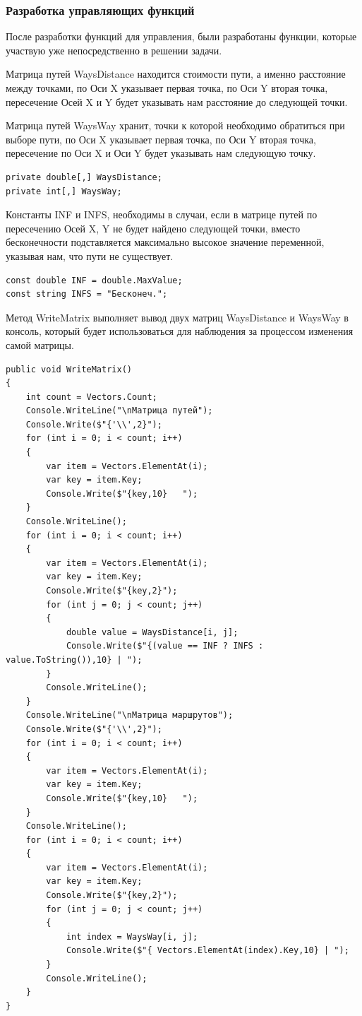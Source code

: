 \documentclass[a4paper,14pt, Times New Roman]{extarticle}
\begin{document}
\subsubsection{Разработка управляющих функций}
После разработки функций для управления, были разработаны функции, которые участвую уже непосредственно в решении задачи. 

Матрица путей WaysDistance находится стоимости пути, а именно расстояние между точками, по Оси X указывает первая точка, по Оси Y вторая точка, пересечение Осей X и Y будет указывать нам расстояние до следующей точки.

Матрица путей WaysWay хранит, точки к которой необходимо обратиться при выборе пути, по Оси X указывает первая точка, по Оси Y вторая точка, пересечение по Оси X и Оси Y будет указывать нам следующую точку.

\begin{lstlisting}
private double[,] WaysDistance;
private int[,] WaysWay;
\end{lstlisting}

Константы INF и INFS, необходимы в случаи, если в матрице путей по пересечению Осей X, Y не будет найдено следующей точки, вместо бесконечности подставляется максимально высокое значение переменной, указывая нам, что пути не существует.

\begin{lstlisting}
const double INF = double.MaxValue;
const string INFS = "Бесконеч.";
\end{lstlisting}

Метод WriteMatrix выполняет вывод двух матриц WaysDistance и WaysWay в консоль, который будет использоваться для наблюдения за процессом изменения самой матрицы.

\begin{lstlisting}
public void WriteMatrix()
{
    int count = Vectors.Count;
    Console.WriteLine("\nМатрица путей");
    Console.Write($"{'\\',2}");
    for (int i = 0; i < count; i++)
    {
        var item = Vectors.ElementAt(i);
        var key = item.Key;
        Console.Write($"{key,10}   ");
    }
    Console.WriteLine();
    for (int i = 0; i < count; i++)
    {
        var item = Vectors.ElementAt(i);
        var key = item.Key;
        Console.Write($"{key,2}");
        for (int j = 0; j < count; j++)
        {
            double value = WaysDistance[i, j];
            Console.Write($"{(value == INF ? INFS : value.ToString()),10} | ");
        }
        Console.WriteLine();
    }
    Console.WriteLine("\nМатрица маршрутов");
    Console.Write($"{'\\',2}");
    for (int i = 0; i < count; i++)
    {
        var item = Vectors.ElementAt(i);
        var key = item.Key;
        Console.Write($"{key,10}   ");
    }
    Console.WriteLine();
    for (int i = 0; i < count; i++)
    {
        var item = Vectors.ElementAt(i);
        var key = item.Key;
        Console.Write($"{key,2}");
        for (int j = 0; j < count; j++)
        {
            int index = WaysWay[i, j];
            Console.Write($"{ Vectors.ElementAt(index).Key,10} | ");
        }
        Console.WriteLine();
    }
}
\end{lstlisting}
\end{document}
